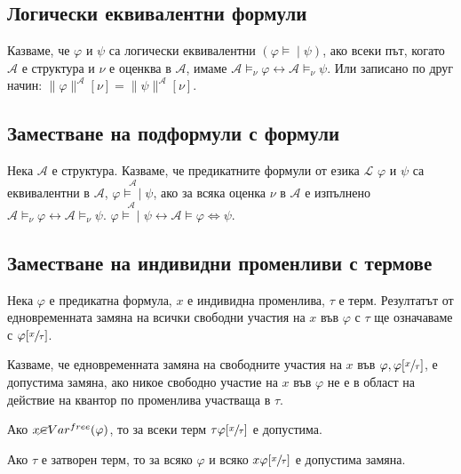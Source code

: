 \documentclass{article}
\newcommand{\mymod}{\models\!\mid}
\begin{document}
\subsection*{Логически еквивалентни формули}

\begin{mydef}
Казваме, че $\varphi$ и $\psi$ са логически еквивалентни $(\varphi \mymod \psi)$, ако всеки път, когато $\mathcal{A}$ е структура и $\nu$ е оценква в $\mathcal{A}$, имаме $\mathcal{A} \models_\nu \varphi \longleftrightarrow \mathcal{A} \models_\nu \psi$. Или записано по друг начин: $\|\varphi\|^\mathcal{A}[\nu] = \|\psi\|^\mathcal{A}[\nu]$.
\end{mydef}

\subsection*{Заместване на подформули с формули}

\begin{mydef}
Нека $\mathcal{A}$ е структура. Казваме, че предикатните формули от езика $\mathcal{L}$ $\varphi$ и $\psi$ са еквивалентни в $\mathcal{A}$, $\varphi\overset{\mathcal{A}}{\mymod} \psi$, ако за всяка оценка $\nu$ в $\mathcal{A}$ е изпълнено $\mathcal{A} \models_\nu \varphi \longleftrightarrow \mathcal{A} \models_\nu \psi$. $\varphi \overset{\mathcal{A}}{\mymod} \psi \longleftrightarrow \mathcal{A} \models \varphi \Leftrightarrow \psi$.
\end{mydef}


\subsection*{Заместване на индивидни променливи с термове}

\begin{mydef}
Нека $\varphi$ е предикатна формула, $x$ е индивидна  променлива, $\tau$ е терм. Резултатът от едновременната замяна на всички свободни участия на $x$ във $\varphi$ с $\tau$ ще означаваме с $\varphi[\sfrac{x}{\tau}]$.

Казваме, че едновременната замяна на свободните участия на $x$ във $\varphi, \varphi[\sfrac{x}{\tau}]$, е допустима замяна, ако никое свободно участие на $x$ във $\varphi$ не е в област на действие на квантор по променлива участваща в $\tau$.

\begin{remark}
Ако $x \cancel{\in} Var^{free}(\varphi)$, то за всеки терм $\tau \varphi[\sfrac{x}{\tau}]$ е допустима.
\end{remark}

\begin{remark}
Ако $\tau$ е затворен терм, то за всяко $\varphi$ и всяко $x \varphi[\sfrac{x}{\tau}]$ е допустима замяна.
\end{remark}

\end{mydef}
\end{document}
